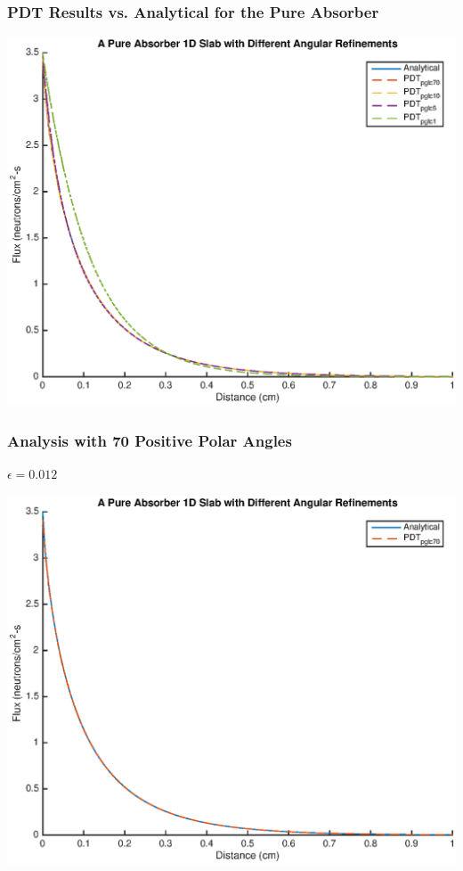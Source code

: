\documentclass[compress]{beamer}
\begin{document}
\begin{frame}[t]\frametitle{PDT Results vs. Analytical for the Pure Absorber}
\centering
\includegraphics[scale = 0.5]{figures/PureAbsorberAllAngles.eps}
\end{frame}

\begin{frame}[t]\frametitle{Analysis with 70 Positive Polar Angles}
\begin{minipage}{0.15\textwidth}
\begin{footnotesize}
$\epsilon = 0.012$
\end{footnotesize}
\end{minipage}
\begin{minipage}{0.8\textwidth}
\centering
\includegraphics[scale = 0.5]{figures/PureAbsorberBestangle.eps}
\end{minipage}
\end{frame}
\end{document}
